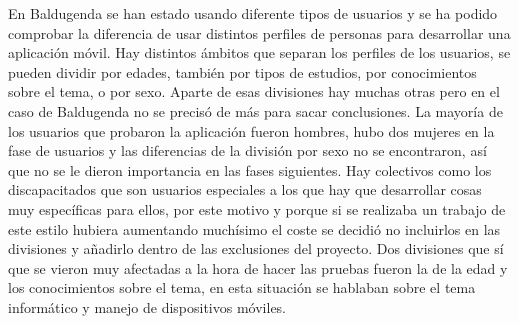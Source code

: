 En Baldugenda se han estado usando diferente tipos de usuarios y se ha podido comprobar la diferencia de usar distintos perfiles de personas para desarrollar una aplicación móvil.
Hay distintos ámbitos que separan los perfiles de los usuarios, se pueden dividir por edades, también por tipos de estudios, por conocimientos sobre el tema, o por sexo.
Aparte de esas divisiones hay muchas otras pero en el caso de Baldugenda no se precisó de más para sacar conclusiones.
La mayoría de los usuarios que probaron la aplicación fueron hombres, hubo dos mujeres en la fase de usuarios y las diferencias de la división por sexo no se encontraron, así que no se le dieron importancia en las fases siguientes.
Hay colectivos como los discapacitados que son usuarios especiales a los que hay que desarrollar cosas muy específicas para ellos, por este motivo y porque si se realizaba un trabajo de este estilo hubiera aumentando muchísimo el coste se decidió no incluirlos en las divisiones y añadirlo dentro de las exclusiones del proyecto.
Dos divisiones que sí que se vieron muy afectadas a la hora de hacer las pruebas fueron la de la edad y los conocimientos sobre el tema, en esta situación se hablaban sobre el tema informático y manejo de dispositivos móviles.

